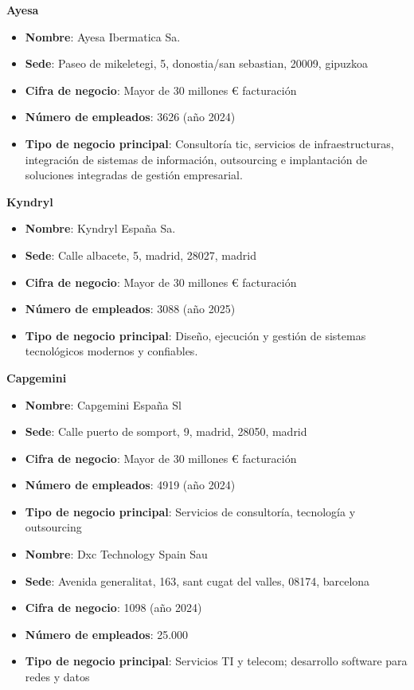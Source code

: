 \documentclass[11.5pt]{article}
\begin{document}
	\noindent\textbf{{\large Ayesa}}
	
	\begin{itemize}
		\item \textbf{Nombre}: Ayesa Ibermatica Sa.
		\item 	\textbf{Sede}: Paseo de mikeletegi, 5, donostia/san sebastian, 20009, gipuzkoa
		\item 	\textbf{Cifra de negocio}: Mayor de 30 millones € facturación
		\item 	\textbf{Número de empleados}: 3626 (año 2024)
		\item 	\textbf{Tipo de negocio principal}: Consultoría tic, servicios de infraestructuras, integración de sistemas de información, outsourcing e implantación de soluciones integradas de gestión empresarial.
	\end{itemize}
	
	\noindent\textbf{{\large Kyndryl}}
	
	\begin{itemize}
		\item \textbf{Nombre}: Kyndryl España Sa.
		\item 	\textbf{Sede}: Calle albacete, 5, madrid, 28027, madrid
		\item 	\textbf{Cifra de negocio}: Mayor de 30 millones € facturación
		\item 	\textbf{Número de empleados}: 3088 (año 2025)
		\item 	\textbf{Tipo de negocio principal}: Diseño, ejecución y gestión de sistemas tecnológicos modernos y confiables.
	\end{itemize}
	
	\noindent\textbf{{\large Capgemini}}
	
	\begin{itemize}
		\item \textbf{Nombre}: Capgemini España Sl
		\item 	\textbf{Sede}: Calle puerto de somport, 9, madrid, 28050, madrid
		\item 	\textbf{Cifra de negocio}: Mayor de 30 millones € facturación
		\item 	\textbf{Número de empleados}: 4919 (año 2024)
		\item 	\textbf{Tipo de negocio principal}: Servicios de consultoría, tecnología y outsourcing
	\end{itemize}
	
	
	\begin{itemize}
		\item \textbf{Nombre}: Dxc Technology Spain Sau
		\item 	\textbf{Sede}: Avenida generalitat, 163, sant cugat del valles, 08174, barcelona
		\item 	\textbf{Cifra de negocio}: 1098 (año 2024)
		\item 	\textbf{Número de empleados}: 25.000
		\item 	\textbf{Tipo de negocio principal}: Servicios TI y telecom; desarrollo software para redes y datos
	\end{itemize}
	
\end{document}
